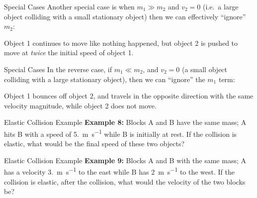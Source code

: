 \documentclass[12pt,compress,aspectratio=169]{beamer}
\begin{document}
\begin{frame}{Special Cases}
  Another special case is when $m_1\gg m_2$ and $v_2=0$ (i.e.\ a large object
  colliding with a small stationary object) then we can effectively ``ignore''
  $m_2$:
  

  Object 1 continues to move like nothing happened, but object 2 is pushed to
  move at \emph{twice} the initial speed of object 1.
\end{frame}



\begin{frame}{Special Cases}
  In the reverse case, if $m_1\ll m_2$, and $v_2=0$ (a small object colliding
  with a large stationary object), then we can ``ignore'' the $m_1$ term:
  

  Object 1 bounces off object 2, and travels in the opposite direction with the
  same velocity magnitude, while object 2 does not move.
\end{frame}



\begin{frame}{Elastic Collision Example}
  \textbf{Example 8:} Blocks A and B have the same mass; A hits B with a speed
  of \SI{5.}{\metre\per\second} while B is initially at rest. If the collision
  is elastic, what would be the final speed of these two objects?
\end{frame}



\begin{frame}{Elastic Collision Example}
  \textbf{Example 9:} Blocks A and B with the same mass; A has a velocity
  \SI{3.}{\metre\per\second} to the east while B has \SI{2}{\metre\per\second}
  to the west. If the collision is elastic, after the collision, what would the
  velocity of the two blocks be?
\end{frame}
\end{document}
